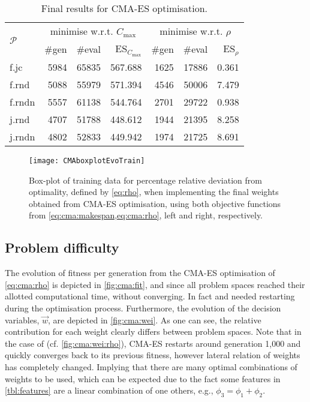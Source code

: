 \begin{table}\centering
	\caption{Final results for CMA-ES optimisation.}\label{cma:funeval}
	\begin{tabular}{l |rrr |rrr}\toprule
		\multirow{2}{*}{$\mathcal{P}$}
		& \multicolumn{3}{c|}{minimise w.r.t. $C_{\max}$}& \multicolumn{3}{c}{minimise w.r.t. $\rho$} \\
		       & \#gen & \#eval & ES$_{C_{\max}}$ & \#gen & \#eval & ES$_\rho$ \\
		\midrule
		f.jc   & 5984  & 65835  & 567.688         & 1625  & 17886  & 0.361     \\
		f.rnd  & 5088  & 55979  & 571.394         & 4546  & 50006  & 7.479     \\
		f.rndn & 5557  & 61138  & 544.764         & 2701  & 29722  & 0.938     \\
		j.rnd  & 4707  & 51788  & 448.612         & 1944  & 21395  & 8.258     \\
		j.rndn & 4802  & 52833  & 449.942         & 1974  & 21725  & 8.691     \\
		\bottomrule
	\end{tabular}
\end{table}

\begin{figure}
	\texttt{[image: CMAboxplotEvoTrain]}
	\caption{Box-plot of training data for percentage relative deviation from optimality, defined by \cref{eq:rho}, when implementing the final weights obtained from CMA-ES optimisation, using both objective functions from \cref{eq:cma:makespan,eq:cma:rho}, left and right, respectively.}\label{fig:cma:trainboxpl}
\end{figure}

\subsection{Problem difficulty}\label{sec:expr:data}
The evolution of fitness per generation from the CMA-ES optimisation of \cref{eq:cma:rho} is depicted in \cref{fig:cma:fit}, and since all problem spaces reached their allotted computational time, without converging. In fact  and  needed restarting during the optimisation process. 
Furthermore, the  evolution of the decision variables, $\vec{w}$, are depicted in \cref{fig:cma:wei}. As one can see, the relative contribution for each weight clearly differs between problem spaces. Note that in the case of  (cf. \cref{fig:cma:wei:rho}), CMA-ES restarts around generation 1,000 and quickly converges back to its previous fitness, however lateral relation of weights has completely changed. Implying that there are many optimal combinations of weights to be used, which can be expected due  to the fact some features in \cref{tbl:features} are a linear combination of one others, e.g., $\phi_3=\phi_1+\phi_2$.

